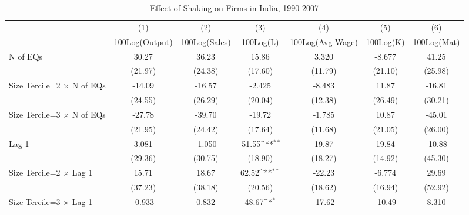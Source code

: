 \begin{table}[htbp]\centering
\def\sym#1{\ifmmode^{#1}\else\(^{#1}\)\fi}
\caption{Effect of Shaking on Firms in India, 1990-2007}
\begin{tabular}{l*{6}{c}}
\toprule
                &\multicolumn{1}{c}{(1)}&\multicolumn{1}{c}{(2)}&\multicolumn{1}{c}{(3)}&\multicolumn{1}{c}{(4)}&\multicolumn{1}{c}{(5)}&\multicolumn{1}{c}{(6)}\\
                &\multicolumn{1}{c}{100Log(Output)}&\multicolumn{1}{c}{100Log(Sales)}&\multicolumn{1}{c}{100Log(L)}&\multicolumn{1}{c}{100Log(Avg Wage)}&\multicolumn{1}{c}{100Log(K)}&\multicolumn{1}{c}{100Log(Mat)}\\
\midrule
N of EQs        &    30.27         &    36.23         &    15.86         &    3.320         &   -8.677         &    41.25         \\
                &  (21.97)         &  (24.38)         &  (17.60)         &  (11.79)         &  (21.10)         &  (25.98)         \\
\addlinespace
Size Tercile=2 $\times$ N of EQs&   -14.09         &   -16.57         &   -2.425         &   -8.483         &    11.87         &   -16.81         \\
                &  (24.55)         &  (26.29)         &  (20.04)         &  (12.38)         &  (26.49)         &  (30.21)         \\
\addlinespace
Size Tercile=3 $\times$ N of EQs&   -27.78         &   -39.70         &   -19.72         &   -1.785         &    10.87         &   -45.01         \\
                &  (21.95)         &  (24.42)         &  (17.64)         &  (11.68)         &  (21.05)         &  (26.00)         \\
\addlinespace
Lag 1           &    3.081         &   -1.050         &   -51.55\sym{**} &    19.87         &    19.84         &   -10.88         \\
                &  (29.36)         &  (30.75)         &  (18.90)         &  (18.27)         &  (14.92)         &  (45.30)         \\
\addlinespace
Size Tercile=2 $\times$ Lag 1&    15.71         &    18.67         &    62.52\sym{**} &   -22.23         &   -6.774         &    29.69         \\
                &  (37.23)         &  (38.18)         &  (20.56)         &  (18.62)         &  (16.94)         &  (52.92)         \\
\addlinespace
Size Tercile=3 $\times$ Lag 1&   -0.933         &    0.832         &    48.67\sym{*}  &   -17.62         &   -10.49         &    8.310         \\

\end{tabular}
\end{table}
